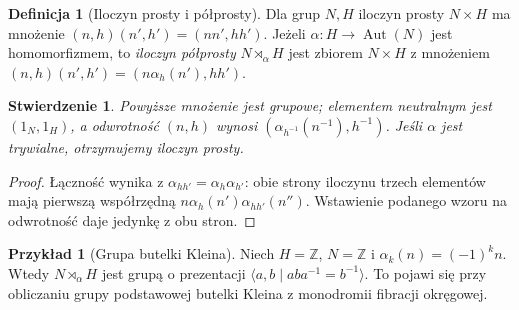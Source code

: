\documentclass[11pt,a4paper,oneside]{report}
\newcommand{\Z}{\mathbb{Z}}
\theoremstyle{plain}
\newtheorem{stwierdzenie}[twierdzenie]{Stwierdzenie}
\theoremstyle{definition}
\newtheorem{definicja}[twierdzenie]{Definicja}
\newtheorem{przyklad}[twierdzenie]{Przykład}
\theoremstyle{remark}
\begin{document}
\begin{definicja}[Iloczyn prosty i półprosty]
Dla grup $N,H$ iloczyn prosty $N\times H$ ma mnożenie
$(n,h)(n',h')=(nn',hh')$. Jeżeli
$\alpha:H\to\operatorname{Aut}(N)$ jest homomorfizmem,
to \emph{iloczyn półprosty} $N\rtimes_\alpha H$ jest zbiorem
$N\times H$ z mnożeniem
$(n,h)(n',h')=(n\alpha_h(n'),hh')$.
\end{definicja}
\begin{stwierdzenie}
Powyższe mnożenie jest grupowe; elementem neutralnym jest
$(1_N,1_H)$, a odwrotność $(n,h)$ wynosi
$(\alpha_{h^{-1}}(n^{-1}),h^{-1})$. Jeśli $\alpha$ jest
trywialne, otrzymujemy iloczyn prosty.
\end{stwierdzenie}
\begin{proof}
Łączność wynika z $\alpha_{hh'}=\alpha_h\alpha_{h'}$:
obie strony iloczynu trzech elementów mają pierwszą współrzędną
$n\alpha_h(n')\alpha_{hh'}(n'')$. Wstawienie podanego wzoru
na odwrotność daje jedynkę z obu stron.
\end{proof}
\begin{przyklad}[Grupa butelki Kleina]
Niech $H=\Z$, $N=\Z$ i $\alpha_k(n)=(-1)^k n$. Wtedy
$N\rtimes_\alpha H$ jest grupą o prezentacji
$\langle a,b\mid aba^{-1}=b^{-1}\rangle$.
To pojawi się przy obliczaniu grupy podstawowej butelki Kleina
z monodromii fibracji okręgowej.
\end{przyklad}
\end{document}
